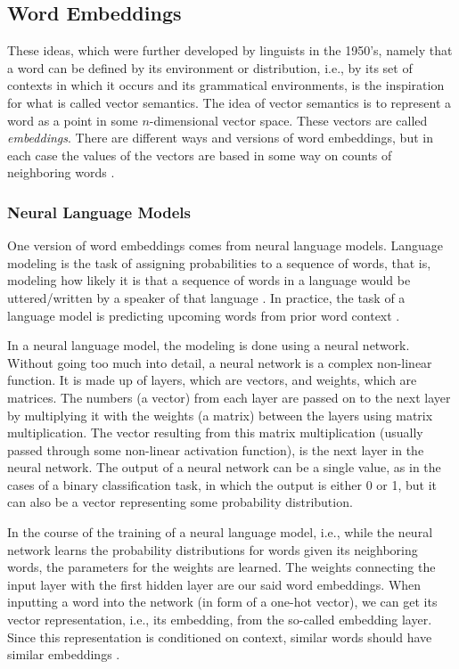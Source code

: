 \subsection{Word Embeddings}
These ideas, which were further developed by linguists in the 1950's, namely that a word can be defined by its environment or distribution, i.e., by its set of contexts in which it occurs and its grammatical environments, is the inspiration for what is called vector semantics.  
The idea of vector semantics is to represent a word as a point in some $n$-dimensional vector space. 
These vectors are called \emph{embeddings}. 
There are different ways and versions of word embeddings, but in each case the values of the vectors are based in some way on counts of neighboring words \autocite[98-99]{jurafsky-2019}.

\subsubsection{Neural Language Models}
One version of word embeddings comes from neural language models.
Language modeling is the task of assigning probabilities to a sequence of words, that is, modeling how likely it is that a sequence of words in a language would be uttered/written by a speaker of that language \autocite[181]{koehn2009}. 
In practice, the task of a language model is predicting upcoming words from prior word context \autocite[137]{jurafsky-2019}.

In a neural language model, the modeling is done using a neural network. 
Without going too much into detail, a neural network is a complex non-linear function. 
It is made up of layers, which are vectors, and weights, which are matrices. 
The numbers (a vector) from each layer are passed on to the next layer by multiplying it with the weights (a matrix) between the layers using matrix multiplication. 
The vector resulting from this matrix multiplication (usually passed through some non-linear activation function), is the next layer in the neural network. 
The output of a neural network can be  a single value, as in the cases of a binary classification task, in which the output is either 0 or 1, but it can also be a vector representing some probability distribution.

In the course of the training of a neural language  model, i.e., while the neural network learns the probability distributions for words given its neighboring words, the parameters for the weights are learned. 
The weights connecting the input layer with the first hidden layer are our said word embeddings. 
When inputting a word into the network (in form of a one-hot vector), we can get its vector representation, i.e., its embedding, from the so-called embedding layer. 
Since this representation is conditioned on context, similar words should have similar embeddings \autocite[104-105]{koehn-2020}.

